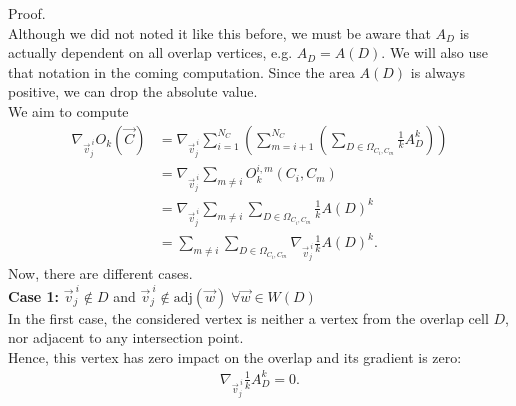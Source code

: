 \begin{proposition}
	Proof. \\
	Although we did not noted it like this before, we must be aware that $A_D$ is actually dependent on all overlap vertices, e.g. $A_D = A(D)$.
	We will also use that notation in the coming computation. 
	Since the area $A(D)$ is always positive, we can drop the absolute value. \\
	We aim to compute 
	\begin{align*}
		\nabla_{\vec{v}_j^{\: i}} O_k(\vec{C}) 
		&= \nabla_{\vec{v}_j^{\: i}} \sum\limits_{i=1}^{N_C} \left( \sum\limits_{m=i+1}^{N_C} \left(\sum\limits_{D \in \Omega_{C_i,C_m}} \frac{1}{k}A_{D}^k\right) \right) \\
		&= \nabla_{\vec{v}_j^{\: i}} \sum\limits_{m \neq i} O_k^{i,m}(C_i, C_m) \\
		&= \nabla_{\vec{v}_j^{\: i}} \sum\limits_{m \neq i} \sum\limits_{D \in \Omega_{C_i,C_m}} \frac{1}{k}A(D)^k \\
		&= \sum\limits_{m \neq i} \sum\limits_{D \in \Omega_{C_i,C_m}} \nabla_{\vec{v}_j^{\: i}} \frac{1}{k}A(D)^k. 
	\end{align*}
	Now, there are different cases. \\
	\textbf{Case 1:} $\vec{v}_j^{\: i} \notin D$ and $\vec{v}_j^{\: i} \notin \text{adj}(\vec{w}) \; \forall \vec{w} \in W(D)$\\
	In the first case, the considered vertex is neither a vertex from the overlap cell $D$, nor adjacent to any intersection point. \\
	Hence, this vertex has zero impact on the overlap and its gradient is zero:
	\begin{align*}
		\nabla_{\vec{v}_j^{\: i}} \frac{1}{k}A_{D}^k = 0.
	\end{align*}


\end{proposition}
